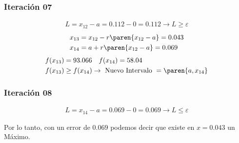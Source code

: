 \begin{homeworkProblem}
\subsubsection{Iteración 07}
\begin{align*}
    L=x_{12}-a=0.112-0=0.112\rightarrow L \geq \varepsilon
\end{align*}
\begin{align*}
    &x_{13}=x_{12} - r\paren{x_{12}-a}= 0.043\\
    &x_{14}=a + r\paren{x_{12}-a}= 0.069
\end{align*}
\begin{align*}
    &f(x_{13})=93.066 \quad f(x_{14})=58.04 \\
    &f(x_{13}) \geq f(x_{14}) \rightarrow \text{ Nuevo Intervalo } = \paren{a,x_{14}}
\end{align*}

\subsubsection{Iteración 08}
\begin{align*}
    L=x_{14}-a=0.069-0=0.069\rightarrow L \leq \varepsilon
\end{align*}

Por lo tanto, con un error de $0.069$ podemos decir que existe en $x=0.043$ un Máximo.

\end{homeworkProblem}